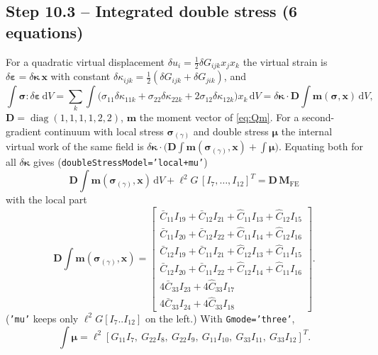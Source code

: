 \documentclass[11pt,a4paper]{article}
\newcommand{\eps}{\bm{\varepsilon}}
\newcommand{\bkap}{\bm{\kappa}}
\newcommand{\bsig}{\bm{\sigma}}
\newcommand{\bmu}{\bm{\mu}}
\newcommand{\bx}{\bm{x}}
\newcommand{\dd}{\,\mathrm{d}}
\newcommand{\code}[1]{\texttt{#1}}
\theoremstyle{plain}
\theoremstyle{remark}
\begin{document}
\subsection*{Step 10.3 -- Integrated double stress (6 equations)}
For a quadratic virtual displacement $\delta u_i=\tfrac12\delta G_{ijk}x_jx_k$ the virtual strain is
$\delta\eps=\delta\bkap\,\bx$ with constant $\delta\kappa_{ijk}=\tfrac12(\delta G_{ijk}+\delta G_{jik})$,
and
\begin{equation}
  \int\bsig:\delta\eps\dd V=\sum_k\int\big(\sigma_{11}\delta\kappa_{11k}+\sigma_{22}\delta\kappa_{22k}
  +2\sigma_{12}\delta\kappa_{12k}\big)x_k\dd V=\delta\bkap\cdot\bm D\!\int\!\bm m(\bsig,\bx)\dd V,
\end{equation}
$\bm D=\operatorname{diag}(1,1,1,1,2,2)$, $\bm m$ the moment vector of \eqref{eq:Qm}. For a
second-gradient continuum with local stress $\bsig_{(\gamma)}$ and double stress $\bmu$ the internal
virtual work of the same field is $\delta\bkap\cdot\big(\bm D\int\bm m(\bsig_{(\gamma)},\bx)+\int\bmu\big)$.
Equating both for all $\delta\bkap$ gives (\code{doubleStressModel='local+mu'})
\begin{equation}
  \boxed{\ \bm D\!\int\!\bm m(\bsig_{(\gamma)},\bx)\dd V+\ell^2G\,[I_7,\dots,I_{12}]^T=\bm D\,\bm M_{\mathrm{FE}}\ }
  \label{eq:eqM}
\end{equation}
with the local part
\begin{equation}
  \bm D\!\int\!\bm m(\bsig_{(\gamma)},\bx)=
  \begin{bmatrix}
  \bar C_{11}I_{19}+\bar C_{12}I_{21}+\hat C_{11}I_{13}+\hat C_{12}I_{15}\\
  \bar C_{11}I_{20}+\bar C_{12}I_{22}+\hat C_{11}I_{14}+\hat C_{12}I_{16}\\
  \bar C_{12}I_{19}+\bar C_{11}I_{21}+\hat C_{12}I_{13}+\hat C_{11}I_{15}\\
  \bar C_{12}I_{20}+\bar C_{11}I_{22}+\hat C_{12}I_{14}+\hat C_{11}I_{16}\\
  4\bar C_{33}I_{23}+4\hat C_{33}I_{17}\\
  4\bar C_{33}I_{24}+4\hat C_{33}I_{18}
  \end{bmatrix}.
  \label{eq:eqMloc}
\end{equation}
(\code{'mu'} keeps only $\ell^2G[I_7..I_{12}]$ on the left.) With \code{Gmode='three'},
\[
  \int\bmu=\ell^2[G_{11}I_7,\ G_{22}I_8,\ G_{22}I_9,\ G_{11}I_{10},\ G_{33}I_{11},\ G_{33}I_{12}]^T .
\]
\end{document}
